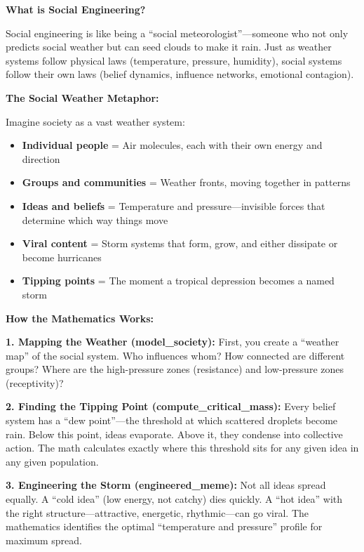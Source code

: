 \documentclass[11pt,twoside]{book}
\theoremstyle{definition}
\theoremstyle{plain}
\theoremstyle{remark}
\begin{document}
\begin{tcolorbox}[colback=green!5!white,colframe=green!65!black,title=\textbf{Plain English: The Social Weather System},breakable]

\textbf{What is Social Engineering?}

Social engineering is like being a ``social meteorologist''---someone who not only predicts social weather but can seed clouds to make it rain. Just as weather systems follow physical laws (temperature, pressure, humidity), social systems follow their own laws (belief dynamics, influence networks, emotional contagion).

\textbf{The Social Weather Metaphor:}

Imagine society as a vast weather system:
\begin{itemize}
    \item \textbf{Individual people} = Air molecules, each with their own energy and direction
    \item \textbf{Groups and communities} = Weather fronts, moving together in patterns
    \item \textbf{Ideas and beliefs} = Temperature and pressure---invisible forces that determine which way things move
    \item \textbf{Viral content} = Storm systems that form, grow, and either dissipate or become hurricanes
    \item \textbf{Tipping points} = The moment a tropical depression becomes a named storm
\end{itemize}

\textbf{How the Mathematics Works:}

\textbf{1. Mapping the Weather (model\_society):}
First, you create a ``weather map'' of the social system. Who influences whom? How connected are different groups? Where are the high-pressure zones (resistance) and low-pressure zones (receptivity)?

\textbf{2. Finding the Tipping Point (compute\_critical\_mass):}
Every belief system has a ``dew point''---the threshold at which scattered droplets become rain. Below this point, ideas evaporate. Above it, they condense into collective action. The math calculates exactly where this threshold sits for any given idea in any given population.

\textbf{3. Engineering the Storm (engineered\_meme):}
Not all ideas spread equally. A ``cold idea'' (low energy, not catchy) dies quickly. A ``hot idea'' with the right structure---attractive, energetic, rhythmic---can go viral. The mathematics identifies the optimal ``temperature and pressure'' profile for maximum spread.


\end{tcolorbox}
\end{document}
